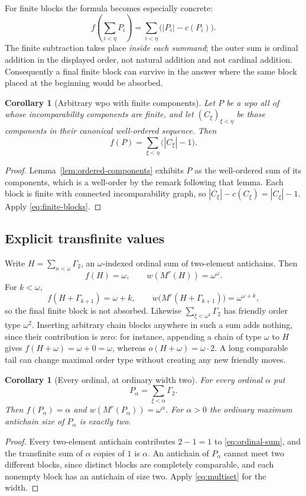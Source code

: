 \documentclass[11pt,letterpaper]{article}
\newtheorem{corollary}[theorem]{Corollary}
\theoremstyle{definition}
\theoremstyle{remark}
\newcommand{\anti}[1]{\Gamma_{#1}}
\begin{document}
For finite blocks the formula becomes especially concrete:
\begin{equation}\label{eq:finite-blocks}
 f\left(\sum_{i<\eta}P_i\right)
 =\sum_{i<\eta}\bigl(|P_i|-c(P_i)\bigr).
\end{equation}
The finite subtraction takes place \emph{inside each summand}; the outer sum
is ordinal addition in the displayed order, not natural addition and not
cardinal addition. Consequently a final finite block can survive in the
answer where the same block placed at the beginning would be absorbed.

\begin{corollary}[Arbitrary wpo with finite components]\label{cor:finite-components}
Let $P$ be a wpo all of whose incomparability components are finite, and let
$(C_\xi)_{\xi<\eta}$ be those components in their canonical well-ordered
sequence. Then
\begin{equation}\label{eq:finite-components-infinite}
 f(P)=\sum_{\xi<\eta}\bigl(|C_\xi|-1\bigr).
\end{equation}
\end{corollary}
\begin{proof}
Lemma~\ref{lem:ordered-components} exhibits $P$ as the well-ordered sum of
its components, which is a well-order by the remark following that lemma.
Each block is finite with connected incomparability graph, so
$|C_\xi|-c(C_\xi)=|C_\xi|-1$. Apply \eqref{eq:finite-blocks}.
\end{proof}

\subsection{Explicit transfinite values}
Write $H=\sum_{n<\omega}\anti2$, an $\omega$-indexed ordinal sum of
two-element antichains. Then
\[
 f(H)=\omega,\qquad w(M^r(H))=\omega^\omega .
\]
For $k<\omega$,
\[
 f(H+\anti{k+1})=\omega+k,
 \qquad
 w\bigl(M^r(H+\anti{k+1})\bigr)=\omega^{\omega+k},
\]
so the final finite block is not absorbed. Likewise
$\sum_{\xi<\omega^2}\anti2$ has friendly order type $\omega^2$. Inserting
arbitrary chain blocks anywhere in such a sum adds nothing, since their
contribution is zero: for instance, appending a chain of type $\omega$ to
$H$ gives $f(H+\omega)=\omega+0=\omega$, whereas
$o(H+\omega)=\omega\cdot2$. A long comparable tail can change maximal
order type without creating any new friendly moves.

\begin{corollary}[Every ordinal, at ordinary width two]\label{cor:all-ordinals}
For every ordinal $\alpha$ put
\[
 P_\alpha=\sum_{\xi<\alpha}\anti2 .
\]
Then $f(P_\alpha)=\alpha$ and $w(M^r(P_\alpha))=\omega^\alpha$. For
$\alpha>0$ the ordinary maximum antichain size of $P_\alpha$ is exactly two.
\end{corollary}
\begin{proof}
Every two-element antichain contributes $2-1=1$ to
\eqref{eq:ordinal-sum}, and the transfinite sum of $\alpha$ copies of $1$ is
$\alpha$. An antichain of $P_\alpha$ cannot meet two different blocks, since
distinct blocks are completely comparable, and each nonempty block has an
antichain of size two. Apply \eqref{eq:multiset} for the width.
\end{proof}
\end{document}
